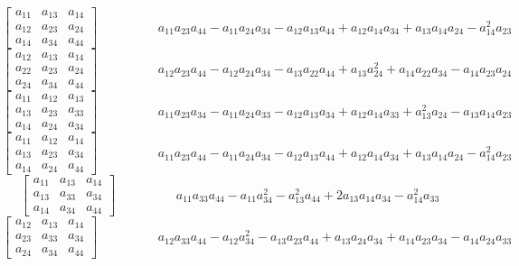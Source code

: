 $$\left[\begin{matrix}a_{11} & a_{13} & a_{14}\\a_{12} & a_{23} & a_{24}\\a_{14} & a_{34} & a_{44}\end{matrix}\right]\hspace{2cm} a_{11} a_{23} a_{44} - a_{11} a_{24} a_{34} - a_{12} a_{13} a_{44} + a_{12} a_{14} a_{34} + a_{13} a_{14} a_{24} - a_{14}^{2} a_{23}$$   
$$\left[\begin{matrix}a_{12} & a_{13} & a_{14}\\a_{22} & a_{23} & a_{24}\\a_{24} & a_{34} & a_{44}\end{matrix}\right]\hspace{2cm} a_{12} a_{23} a_{44} - a_{12} a_{24} a_{34} - a_{13} a_{22} a_{44} + a_{13} a_{24}^{2} + a_{14} a_{22} a_{34} - a_{14} a_{23} a_{24}$$   
$$\left[\begin{matrix}a_{11} & a_{12} & a_{13}\\a_{13} & a_{23} & a_{33}\\a_{14} & a_{24} & a_{34}\end{matrix}\right]\hspace{2cm} a_{11} a_{23} a_{34} - a_{11} a_{24} a_{33} - a_{12} a_{13} a_{34} + a_{12} a_{14} a_{33} + a_{13}^{2} a_{24} - a_{13} a_{14} a_{23}$$   
$$\left[\begin{matrix}a_{11} & a_{12} & a_{14}\\a_{13} & a_{23} & a_{34}\\a_{14} & a_{24} & a_{44}\end{matrix}\right]\hspace{2cm} a_{11} a_{23} a_{44} - a_{11} a_{24} a_{34} - a_{12} a_{13} a_{44} + a_{12} a_{14} a_{34} + a_{13} a_{14} a_{24} - a_{14}^{2} a_{23}$$   
$$\left[\begin{matrix}a_{11} & a_{13} & a_{14}\\a_{13} & a_{33} & a_{34}\\a_{14} & a_{34} & a_{44}\end{matrix}\right]\hspace{2cm} a_{11} a_{33} a_{44} - a_{11} a_{34}^{2} - a_{13}^{2} a_{44} + 2 a_{13} a_{14} a_{34} - a_{14}^{2} a_{33}$$   
$$\left[\begin{matrix}a_{12} & a_{13} & a_{14}\\a_{23} & a_{33} & a_{34}\\a_{24} & a_{34} & a_{44}\end{matrix}\right]\hspace{2cm} a_{12} a_{33} a_{44} - a_{12} a_{34}^{2} - a_{13} a_{23} a_{44} + a_{13} a_{24} a_{34} + a_{14} a_{23} a_{34} - a_{14} a_{24} a_{33}$$   
